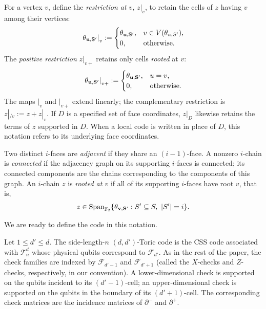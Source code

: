 \begin{definition}
For a vertex $v$, define the \emph{restriction at $v$}, $z|_v$, to retain the cells of $z$ having $v$ among their vertices:
\begin{equation*}
  \left.\mathbf{\theta_{u ,S'} }\right|_v
  :=\begin{cases}
      \mathbf{\theta_{u ,S'} },&v\in V(\theta_{u,S'}),\\
      0,&\text{otherwise}.
    \end{cases}
\end{equation*}
The \emph{positive restriction} $z|_{v+}$ retains only cells \emph{rooted} at $v$:
\begin{equation*}
  \left.\mathbf{\theta_{u ,S'} }\right|_{v+}
  :=\begin{cases}
      \mathbf{\theta_{u ,S'} },&u=v,\\
      0,&\text{otherwise}.
    \end{cases}
\end{equation*}
The maps $|_v$ and $|_{v+}$ extend linearly; the complementary restriction is $z|_{/v}:=z+z|_v$. If $D$ is a specified set of face coordinates, $z|_D$ likewise retains the terms of $z$ supported in $D$. When a local code is written in place of $D$, this notation refers to its underlying face coordinates.

Two distinct $i$-faces are \emph{adjacent} if they share an $(i-1)$-face. A nonzero $i$-chain is \emph{connected} if the adjacency graph on its supporting $i$-faces is connected; its connected components are the chains corresponding to the components of this graph. An $i$-chain $z$ is \emph{rooted at $v$} if all of its supporting $i$-faces have root $v$, that is,
\begin{equation*}
  z\in\operatorname{Span}_{\mathbb F_2}
       \{\mathbf{\theta_{v ,S'} }:S'\subseteq S,\ |S'|=i\}.
\end{equation*}
\end{definition}

We are ready to define the code in this notation.

\begin{definition}
Let $1\le d'\le d$. The side-length-$n$ $(d,d')$-Toric code is the CSS code associated with $\mathcal T_n^d$ whose physical qubits correspond to $\mathcal F_{d'}$. As in the rest of the paper, the check families are indexed by $\mathcal F_{d'-1}$ and $\mathcal F_{d'+1}$ (called the $X$-checks and $Z$-checks, respectively, in our convention). A lower-dimensional check is supported on the qubits incident to its $(d'-1)$-cell; an upper-dimensional check is supported on the qubits in the boundary of its $(d'+1)$-cell. The corresponding check matrices are the incidence matrices of $\partial^-$ and $\partial^+$.
\end{definition}

